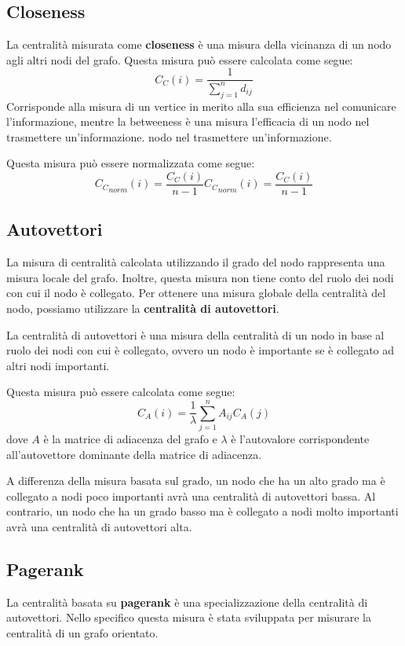 \subsection{Closeness}
La centralità misurata come \textbf{closeness} è una misura della vicinanza di
un nodo agli altri nodi del grafo. Questa misura può essere calcolata come segue:
\begin{equation}
    C_C(i) = \frac{1}{\sum_{j=1}^{n} d_{ij}}
\end{equation}
Corrisponde alla misura di un vertice in merito alla sua efficienza nel
comunicare l'informazione, mentre la betweeness è una misura l'efficacia di un
nodo nel trasmettere un'informazione.
nodo nel trasmettere un'informazione.

Questa misura può essere normalizzata come segue:
\begin{equation}
    {C_C}_{norm}(i) = \frac{C_C(i)}{n - 1}
    {C_C}_{norm}(i) = \frac{C_C(i)}{n - 1}
\end{equation}
\subsection{Autovettori}
La misura di centralità calcolata utilizzando il grado del nodo rappresenta una
misura locale del grafo. Inoltre, questa misura non tiene conto del ruolo dei
nodi con cui il nodo è collegato. Per ottenere una misura globale della
centralità del nodo, possiamo utilizzare la \textbf{centralità di autovettori}.

La centralità di autovettori è una misura della centralità di un nodo in base
al ruolo dei nodi con cui è collegato, ovvero un nodo è importante se è
collegato ad altri nodi importanti.

Questa misura può essere calcolata come segue:
\begin{equation}
    C_A(i) = \frac{1}{\lambda} \sum_{j=1}^{n} A_{ij} C_A(j)
\end{equation}
dove $A$ è la matrice di adiacenza del grafo e $\lambda$ è l'autovalore
corrispondente all'autovettore dominante della matrice di adiacenza. 

A differenza della misura basata sul grado, un nodo che ha un alto grado ma è
collegato a nodi poco importanti avrà una centralità di autovettori bassa. Al
contrario, un nodo che ha un grado basso ma è collegato a nodi molto importanti
avrà una centralità di autovettori alta.
\subsection{Pagerank}
La centralità basata su \textbf{pagerank} è una specializzazione della centralità
di autovettori. Nello specifico questa misura è stata sviluppata per misurare
la centralità di un grafo orientato.

